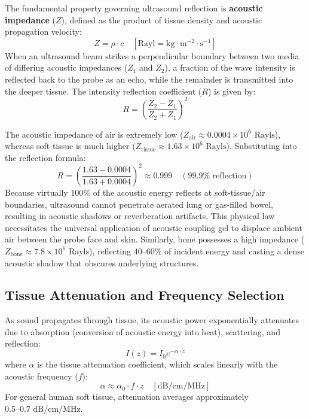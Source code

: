 \documentclass[11pt,a4paper]{article}
\begin{document}
The fundamental property governing ultrasound reflection is \textbf{acoustic impedance} ($Z$), defined as the product of tissue density and acoustic propagation velocity:
\begin{equation}
    Z = \rho \cdot c \quad \left[\text{Rayl} = \text{kg} \cdot \text{m}^{-2} \cdot \text{s}^{-1}\right]
\end{equation}
When an ultrasound beam strikes a perpendicular boundary between two media of differing acoustic impedances ($Z_1$ and $Z_2$), a fraction of the wave intensity is reflected back to the probe as an echo, while the remainder is transmitted into the deeper tissue. The intensity reflection coefficient ($R$) is given by:
\begin{equation}
    R = \left( \frac{Z_2 - Z_1}{Z_2 + Z_1} \right)^2
\end{equation}

\begin{physicsbox}
The acoustic impedance of air is extremely low ($Z_{\text{air}} \approx 0.0004 \times 10^6\text{ Rayls}$), whereas soft tissue is much higher ($Z_{\text{tissue}} \approx 1.63 \times 10^6\text{ Rayls}$). Substituting into the reflection formula:
\begin{equation}
    R = \left( \frac{1.63 - 0.0004}{1.63 + 0.0004} \right)^2 \approx 0.999 \quad (99.9\% \text{ reflection})
\end{equation}
Because virtually $100\%$ of the acoustic energy reflects at soft-tissue/air boundaries, ultrasound cannot penetrate aerated lung or gas-filled bowel, resulting in acoustic shadows or reverberation artifacts. This physical law necessitates the universal application of acoustic coupling gel to displace ambient air between the probe face and skin. Similarly, bone possesses a high impedance ($Z_{\text{bone}} \approx 7.8 \times 10^6\text{ Rayls}$), reflecting $40\text{--}60\%$ of incident energy and casting a dense acoustic shadow that obscures underlying structures.
\end{physicsbox}

\subsection{Tissue Attenuation and Frequency Selection}
As sound propagates through tissue, its acoustic power exponentially attenuates due to absorption (conversion of acoustic energy into heat), scattering, and reflection:
\begin{equation}
    I(z) = I_0 e^{-\alpha \cdot z}
\end{equation}
where $\alpha$ is the tissue attenuation coefficient, which scales linearly with the acoustic frequency ($f$):
\begin{equation}
    \alpha \approx \alpha_0 \cdot f \cdot z \quad \left[\text{dB} / \text{cm} / \text{MHz}\right]
\end{equation}
For general human soft tissue, attenuation averages approximately $0.5\text{--}0.7\text{ dB/cm/MHz}$. 
\end{document}
